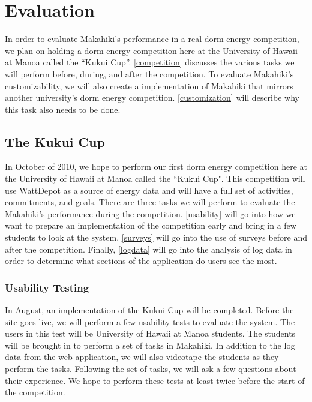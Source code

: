 \chapter{Evaluation}
\label{evaluation}

In order to evaluate Makahiki's performance in a real dorm energy competition, we plan on holding a dorm energy competition here at the University of Hawaii at Manoa called the ``Kukui Cup''.  \autoref{competition} discusses the various tasks we will perform before, during, and after the competition.  To evaluate Makahiki's customizability, we will also create a implementation of Makahiki that mirrors another university's dorm energy competition.  \autoref{customization} will describe why this task also needs to be done.

\section{The Kukui Cup}
\label{competition}

In October of 2010, we hope to perform our first dorm energy competition here at the University of Hawaii at Manoa called the ``Kukui Cup".  This competition will use WattDepot as a source of energy data and will have a full set of activities, commitments, and goals.  There are three tasks we will perform to evaluate the Makahiki's performance during the competition.  \autoref{usability} will go into how we want to prepare an implementation of the competition early and bring in a few students to look at the system.  \autoref{surveys} will go into the use of surveys before and after the competition.  Finally, \autoref{logdata} will go into the analysis of log data in order to determine what sections of the application do users see the most.

\subsection{Usability Testing}
\label{usability}

In August, an implementation of the Kukui Cup will be completed.  Before the site goes live, we will perform a few usability tests to evaluate the system.  The users in this test will be University of Hawaii at Manoa students.  The students will be brought in to perform a set of tasks in Makahiki.  In addition to the log data from the web application, we will also videotape the students as they perform the tasks.  Following the set of tasks, we will ask a few questions about their experience.  We hope to perform these tests at least twice before the start of the competition.

